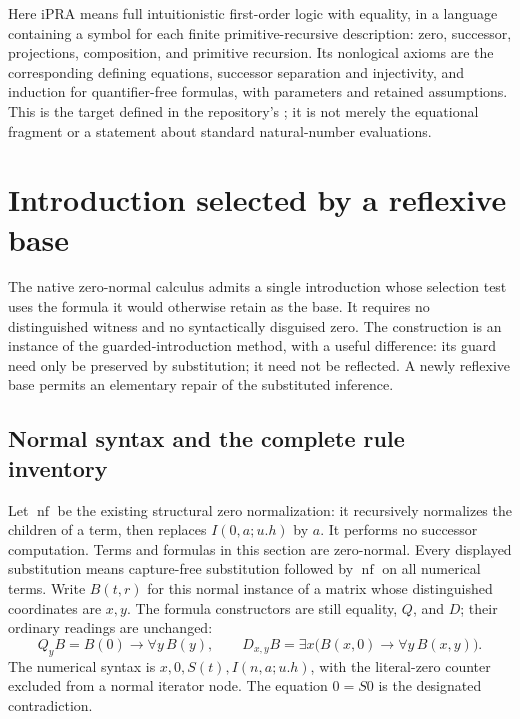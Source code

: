 \documentclass[11pt,a4paper]{article}
\theoremstyle{definition}
\newcommand{\file}[1]{\texttt{\detokenize{#1}}}
\begin{document}
Here iPRA means full intuitionistic first-order logic with equality, in a
language containing a symbol for each finite primitive-recursive
description: zero, successor, projections, composition, and primitive
recursion. Its nonlogical axioms are the corresponding defining equations,
successor separation and injectivity, and induction for quantifier-free
formulas, with parameters and retained assumptions. This is the target
defined in the repository's \file{PR.lean}; it is not merely the equational
fragment or a statement about standard natural-number evaluations.

\clearpage
\tableofcontents
\clearpage

\section{Introduction selected by a reflexive base}
\label{sec:reflexive-base}

The native zero-normal calculus admits a single introduction whose
selection test uses the formula it would otherwise retain as the base.
It requires no distinguished witness and no syntactically disguised zero.
The construction is an instance of the guarded-introduction method, with
a useful difference: its guard need only be preserved by substitution;
it need not be reflected.  A newly reflexive base permits an elementary
repair of the substituted inference.

\subsection{Normal syntax and the complete rule inventory}

Let $\operatorname{nf}$ be the existing structural zero normalization:
it recursively normalizes the children of a term, then replaces
$I(0,a;u.h)$ by $a$.  It performs no successor computation.
Terms and formulas in this section are zero-normal.  Every displayed
substitution means capture-free substitution followed by
$\operatorname{nf}$ on all numerical terms.  Write $B(t,r)$ for this
normal instance of a matrix whose distinguished coordinates are $x,y$.
The formula constructors are still equality, $Q$, and $D$; their ordinary
readings are unchanged:
\[
 Q_yB=B(0)\to\forall y\,B(y),\qquad
 D_{x,y}B=\exists x\bigl(B(x,0)\to\forall y\,B(x,y)\bigr).
\]
The numerical syntax is $x,0,S(t),I(n,a;u.h)$, with the literal-zero
counter excluded from a normal iterator node.  The equation $0=S0$ is
the designated contradiction.
\end{document}
